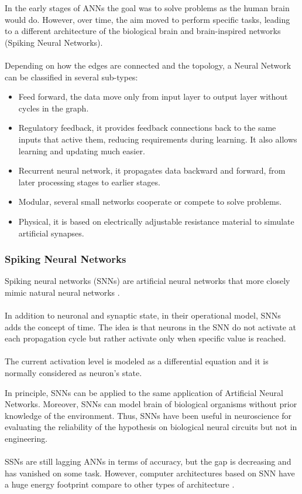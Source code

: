 In the early stages of ANNs the goal was to solve problems as the human brain would do. However, over time, the aim moved to perform specific tasks, leading to a different architecture of the biological brain and brain-inspired networks (Spiking Neural Networks).\\\\
Depending on how the edges are connected and the topology, a Neural Network can be classified in several sub-types:
\begin{itemize}
\item Feed forward, the data move only from input layer to output layer without cycles in the graph.
\item Regulatory feedback, it provides feedback connections back to the same inputs that active them, reducing requirements during learning. It also allows learning and updating much easier.
\item Recurrent neural network, it propagates data backward and forward, from later processing stages to earlier stages.
\item Modular, several small networks cooperate or compete to solve problems.
\item Physical, it is based on electrically adjustable resistance material to simulate artificial synapses.
\end{itemize}

\subsubsection{Spiking Neural Networks}
Spiking neural networks (SNNs) are artificial neural networks that more closely mimic natural neural networks \cite{article:1}. \\\\In addition to neuronal and synaptic state, in their operational model, SNNs adds the concept of time. The idea is that neurons in the SNN do not activate at each propagation cycle but rather activate only when specific value is reached.\\\\
The current activation level is modeled as a differential equation and it is normally considered as neuron's state.

In principle, SNNs can be applied to the same application of Artificial Neural Networks. Moreover, SNNs can model brain of biological organisms without prior knowledge of the environment. Thus, SNNs have been useful in neuroscience for evaluating the reliability of the hypothesis on biological neural circuits but not in engineering.\\\\
SSNs are still lagging ANNs in terms of accuracy, but the gap is decreasing and has vanished on some task\cite{article:2}. However, computer architectures based on SNN have a huge energy footprint compare to other types of architecture \cite{paper:44}.
\newpage
